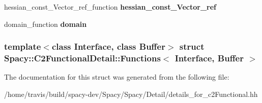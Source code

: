 \begin{DoxyCompactItemize}
\item 
\hypertarget{structSpacy_1_1C2FunctionalDetail_1_1Functions_aa28a6a09e87bc5e7714d0151144a4d41}{hessian\-\_\-const\-\_\-\-Vector\-\_\-ref\-\_\-function {\bfseries hessian\-\_\-const\-\_\-\-Vector\-\_\-ref}}\label{structSpacy_1_1C2FunctionalDetail_1_1Functions_aa28a6a09e87bc5e7714d0151144a4d41}

\item 
\hypertarget{structSpacy_1_1C2FunctionalDetail_1_1Functions_a39cdfa62d965d5b8a6549cd10b7f7276}{domain\-\_\-function {\bfseries domain}}\label{structSpacy_1_1C2FunctionalDetail_1_1Functions_a39cdfa62d965d5b8a6549cd10b7f7276}

\end{DoxyCompactItemize}
\subsubsection*{template$<$class \-Interface, class \-Buffer$>$ struct Spacy\-::\-C2\-Functional\-Detail\-::\-Functions$<$ Interface, Buffer $>$}



\-The documentation for this struct was generated from the following file\-:\begin{DoxyCompactItemize}
\item 
/home/travis/build/spacy-\/dev/\-Spacy/\-Spacy/\-Detail/details\-\_\-for\-\_\-c2\-Functional.\-hh\end{DoxyCompactItemize}

